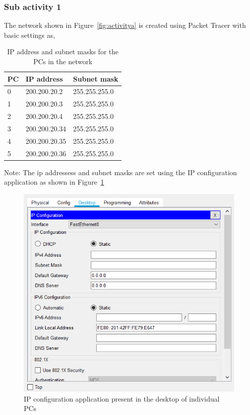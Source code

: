 \documentclass{lab_sheet}
\newcommand{\setting}[2]{
    \begin{tabular}{C{3cm}C{5cm}C{5cm}}
        \toprule
          #1 & IP address & Subnet mask\\
          \midrule
          #2
          \bottomrule
       \end{tabular}
}
\begin{document}
    \subsubsection*{Sub activity 1}
    The network shown in Figure~\ref{fig:activitya} is created using Packet Tracer with basic settings as,
    \begin{table}[H]
        \centering
        \begin{threeparttable}
        \setting{PC}{
        0 & 200.200.20.2  & 255.255.255.0 \\
        1 & 200.200.20.3  & 255.255.255.0 \\
        2 & 200.200.20.4  & 255.255.255.0 \\
        3 & 200.200.20.34 & 255.255.255.0 \\
        4 & 200.200.20.35 & 255.255.255.0 \\
        5 & 200.200.20.36 & 255.255.255.0 \\}
  \begin{tablenotes}
    \small
    \item Note: The ip addressess and subnet masks are set using the IP configuration application as shown in Figure~\ref{fig:pcsetting}
  \end{tablenotes}
  \caption{IP address and subnet masks for the PCs in the network}
  \label{tbl:pcsetting}
        \end{threeparttable}
    \end{table}
    \begin{figure}[H]
        \centering
        \includegraphics[frame, scale=1]{./Figures/pcsetting.png}
        \caption{IP configuration application present in the desktop of individual PCs}
        \label{fig:pcsetting}
    \end{figure}
\end{document}
